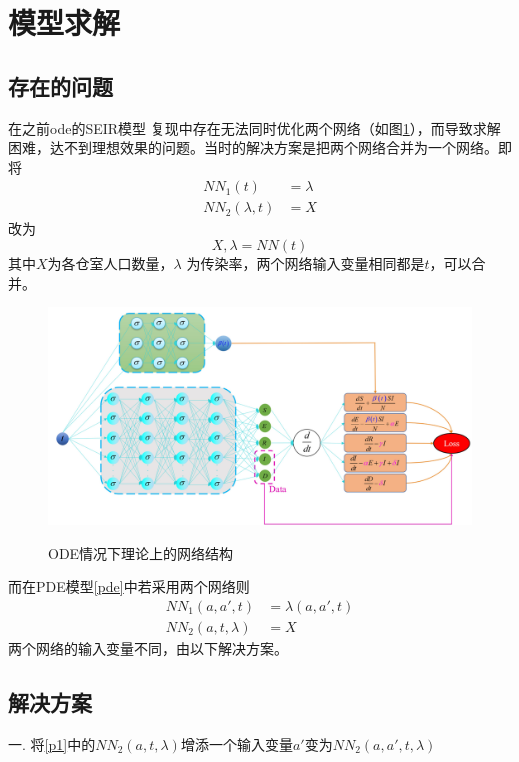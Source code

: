 \documentclass{article}
\numberwithin{figure}{section}
\numberwithin{equation}{section}
\numberwithin{table}{section}
\begin{document}
\section{模型求解} \label{problem}
\subsection{存在的问题}
在之前ode的SEIR模型\cite{he2023transmission} 复现中存在无法同时优化两个网络（如图\ref{ode-nn}），而导致求解困难，达不到理想效果的问题。当时的解决方案是把两个网络合并为一个网络。即将
\begin{equation}
\begin{aligned}
NN_1(t)&=\lambda\\
NN_2(\lambda,t)&=X
\end{aligned}
\end{equation}
改为
\begin{equation}
    X,\lambda=NN(t)
\end{equation}
其中$X$为各仓室人口数量，$\lambda$ 为传染率，两个网络输入变量相同都是$t$，可以合并。
\begin{figure}[htbp]
    \centering
    \includegraphics[width=0.8\linewidth]{img/seir.png}\label{ode-nn}
    \caption{ODE情况下理论上的网络结构}
\end{figure}
而在PDE模型\eqref{pde}中若采用两个网络则
\begin{equation}
\begin{aligned}\label{p1}
    NN_1(a,a',t)&=\lambda(a,a',t)\\
    NN_2(a,t,\lambda)&=X
\end{aligned}
\end{equation}
两个网络的输入变量不同，由以下解决方案。
\subsection{解决方案}
一. 将\eqref{p1}中的$NN_2(a,t,\lambda)$增添一个输入变量$a'$变为$NN_2(a,a',t,\lambda)$
\end{document}
